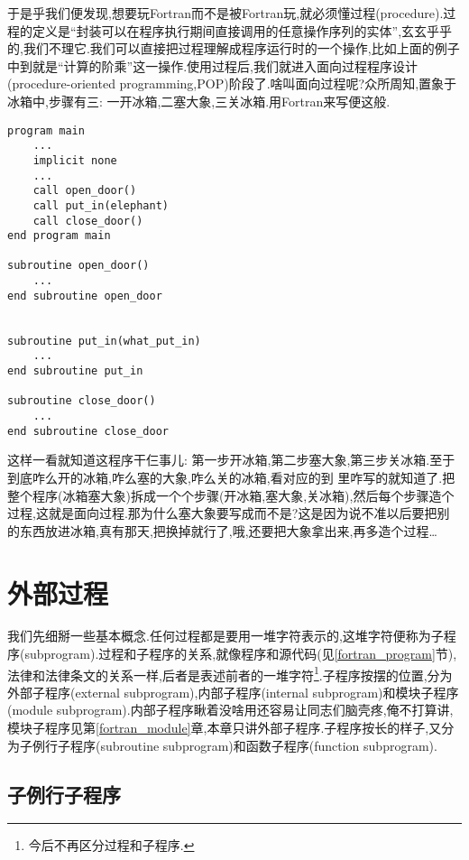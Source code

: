 于是乎我们便发现,想要玩Fortran而不是被Fortran玩,就必须懂过程(procedure).过程的定义是``封装可以在程序执行期间直接调用的任意操作序列的实体'',玄玄乎乎的,我们不理它.我们可以直接把过程理解成程序运行时的一个操作,比如上面的例子中到就是``计算的阶乘''这一操作.使用过程后,我们就进入面向过程程序设计(procedure-oriented programming,POP)阶段了.啥叫面向过程呢?众所周知,置象于冰箱中,步骤有三: 一开冰箱,二塞大象,三关冰箱.用Fortran来写便这般.
\begin{lstlisting}
program main
    ...
    implicit none
    ...
    call open_door()
    call put_in(elephant)
    call close_door()
end program main

subroutine open_door()
    ...
end subroutine open_door


subroutine put_in(what_put_in)
    ...
end subroutine put_in

subroutine close_door()
    ...
end subroutine close_door
\end{lstlisting}
这样一看就知道这程序干仨事儿: 第一步开冰箱,第二步塞大象,第三步关冰箱.至于到底咋么开的冰箱,咋么塞的大象,咋么关的冰箱,看对应的到
里咋写的就知道了.把整个程序(冰箱塞大象)拆成一个个步骤(开冰箱,塞大象,关冰箱),然后每个步骤造个过程,这就是面向过程.那为什么塞大象要写成而不是?这是因为说不准以后要把别的东西放进冰箱,真有那天,把换掉就行了,哦,还要把大象拿出来,再多造个过程\dots

\section{外部过程}

我们先细掰一些基本概念.任何过程都是要用一堆字符表示的,这堆字符便称为子程序(subprogram).过程和子程序的关系,就像程序和源代码(见\ref{fortran_program}节),法律和法律条文的关系一样,后者是表述前者的一堆字符\footnote{今后不再区分过程和子程序.}.子程序按摆的位置,分为外部子程序(external subprogram),内部子程序(internal subprogram)和模块子程序(module subprogram).内部子程序瞅着没啥用还容易让同志们脑壳疼,俺不打算讲,模块子程序见第\ref{fortran_module}章,本章只讲外部子程序.子程序按长的样子,又分为子例行子程序(subroutine subprogram)和函数子程序(function subprogram).

\subsection{子例行子程序}

